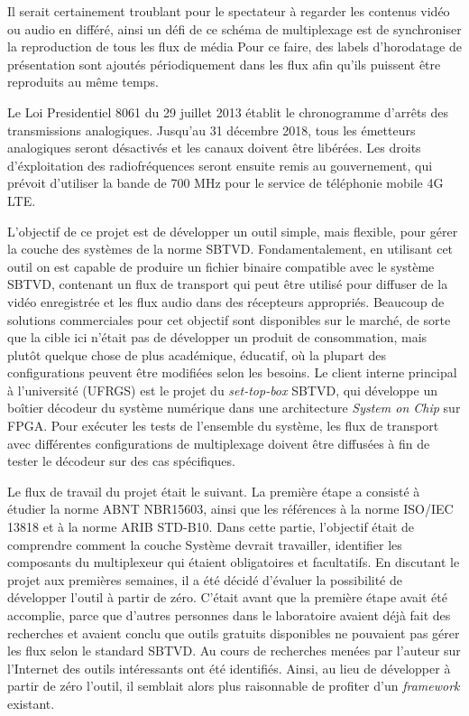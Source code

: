 \documentclass[12pt,a4paper]{article}
\begin{document}
Il serait certainement troublant pour le spectateur à regarder les contenus vidéo ou audio en différé, ainsi un défi de ce schéma de multiplexage est de synchroniser la reproduction de tous les flux de média Pour ce faire, des labels d'horodatage de présentation sont ajoutés périodiquement dans les flux afin qu'ils puissent être reproduits au même temps.

Le Loi Presidentiel 8061 \cite{decreto8061} du 29 juillet 2013 établit le chronogramme d'arrêts des transmissions analogiques. Jusqu'au 31 décembre 2018, tous les émetteurs analogiques seront désactivés et les canaux doivent être libérées. Les droits d'éxploitation des radiofréquences seront ensuite remis au gouvernement, qui prévoit d'utiliser la bande de 700 MHz pour le service de téléphonie mobile 4G LTE.

L'objectif de ce projet est de développer un outil simple, mais flexible, pour gérer la couche des systèmes de la norme SBTVD. Fondamentalement, en utilisant cet outil on est capable de produire un fichier binaire compatible avec le système SBTVD, contenant un flux de transport qui peut être utilisé pour diffuser de la vidéo enregistrée et les flux audio dans des récepteurs appropriés. Beaucoup de solutions commerciales pour cet objectif sont disponibles sur le marché, de sorte que la cible ici n'était pas de développer un produit de consommation, mais plutôt quelque chose de plus académique, éducatif, où la plupart des configurations peuvent être modifiées selon les besoins. Le client interne principal à l'université (UFRGS) est le projet du \textit{set-top-box} SBTVD, qui développe un boîtier décodeur du système numérique dans une architecture \textit{System on Chip} sur FPGA. Pour exécuter les tests de l'ensemble du système, les flux de transport avec différentes configurations de multiplexage doivent être diffusées à fin de tester le décodeur sur des cas spécifiques.

Le flux de travail du projet était le suivant. La première étape a consisté à étudier la norme ABNT NBR15603, ainsi que les références à la norme ISO/IEC 13818 et à la norme ARIB STD-B10. Dans cette partie, l'objectif était de comprendre comment la couche Système devrait travailler, identifier les composants du multiplexeur qui étaient obligatoires et facultatifs. En discutant le projet aux premières semaines, il a été décidé d'évaluer la possibilité de développer l'outil à partir de zéro. C'était avant que la première étape avait été accomplie, parce que d'autres personnes dans le laboratoire avaient déjà fait des recherches et avaient conclu que outils gratuits disponibles ne pouvaient pas gérer les flux selon le standard SBTVD. Au cours de recherches menées par l'auteur sur l'Internet des outils intéressants ont été identifiés. Ainsi, au lieu de développer à partir de zéro l'outil, il semblait alors plus raisonnable de profiter d'un \textit{framework} existant.
\end{document}
